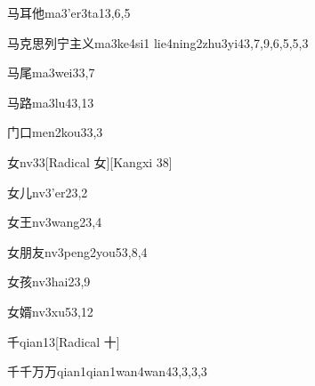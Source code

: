\begin{verbete}{马耳他}{ma3'er3ta1}{3,6,5}
\end{verbete}

\begin{verbete}{马克思列宁主义}{ma3ke4si1 lie4ning2zhu3yi4}{3,7,9,6,5,5,3}
\end{verbete}

\begin{verbete}{马尾}{ma3wei3}{3,7}
\end{verbete}

\begin{verbete}{马路}{ma3lu4}{3,13}
\end{verbete}

\begin{verbete}{门口}{men2kou3}{3,3}
\end{verbete}

\begin{verbete}{女}{nv3}{3}[Radical 女][Kangxi 38]
\end{verbete}

\begin{verbete}{女儿}{nv3'er2}{3,2}
\end{verbete}

\begin{verbete}{女王}{nv3wang2}{3,4}
\end{verbete}

\begin{verbete}{女朋友}{nv3peng2you5}{3,8,4}
\end{verbete}

\begin{verbete}{女孩}{nv3hai2}{3,9}
\end{verbete}

\begin{verbete}{女婿}{nv3xu5}{3,12}
\end{verbete}

\begin{verbete}{千}{qian1}{3}[Radical 十]
\end{verbete}

\begin{verbete}{千千万万}{qian1qian1wan4wan4}{3,3,3,3}
\end{verbete}

